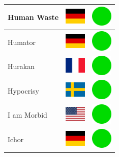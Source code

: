 \documentclass[12pt, a4paper, twoside]{report}
\begin{document}
\begin{center}
\begin{longtable}{|p{5cm}|p{2cm}|p{2cm}|}
 Human Waste                                                & \includegraphics[width=1cm]{../4x3/de} &   \includegraphics[width=1cm]{../likes/y} \\ \hline
 Humator                                                    & \includegraphics[width=1cm]{../4x3/de} &   \includegraphics[width=1cm]{../likes/y} \\ \hline
 Hurakan                                                    & \includegraphics[width=1cm]{../4x3/fr} &   \includegraphics[width=1cm]{../likes/y} \\ \hline
 Hypocrisy                                                  & \includegraphics[width=1cm]{../4x3/se} &   \includegraphics[width=1cm]{../likes/y} \\ \hline
 I am Morbid                                                & \includegraphics[width=1cm]{../4x3/us} &   \includegraphics[width=1cm]{../likes/y} \\ \hline
 Ichor                                                      & \includegraphics[width=1cm]{../4x3/de} &   \includegraphics[width=1cm]{../likes/y} \\ \hline

\end{longtable}
\end{center}
\end{document}
